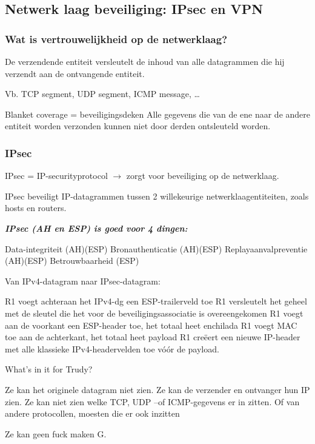 \subsection{Netwerk laag beveiliging: IPsec en VPN}

\subsubsection{Wat is vertrouwelijkheid op de netwerklaag?}

\be
\itf De verzendende entiteit versleutelt de inhoud van alle datagrammen die hij verzendt aan de ontvangende entiteit.

\be
\itf Vb. TCP segment, UDP segment, ICMP message, …
\ee

\itf Blanket coverage = beveiligingsdeken
\be
\itf Alle gegevens die van de ene naar de andere entiteit worden verzonden kunnen niet door derden ontsleuteld worden.
\ee

\ee

\subsubsection{IPsec}

\noindent IPsec = IP-securityprotocol $\rightarrow$ zorgt voor beveiliging op de netwerklaag.

\noindent IPsec beveiligt IP-datagrammen tussen 2 willekeurige netwerklaagentiteiten, zoals hosts en routers.

\noindent \textit{\textbf{IPsec (AH en ESP) is goed voor 4 dingen:}}

\be
\itf Data-integriteit (AH)(ESP)
\itf Bronauthenticatie (AH)(ESP)
\itf Replayaanvalpreventie (AH)(ESP)
\itf Betrouwbaarheid (ESP)
\ee

\noindent Van IPv4-datagram naar IPsec-datagram:

\be
\itf R1 voegt achteraan het IPv4-dg een ESP-trailerveld toe
\itf R1 versleutelt het geheel met de sleutel die het voor de beveiligingsassociatie is overeengekomen
\itf R1 voegt aan de voorkant een ESP-header toe, het totaal heet enchilada
\itf R1 voegt MAC toe aan de achterkant, het totaal heet payload
\itf R1 creëert een nieuwe IP-header met alle klassieke IPv4-headervelden toe vóór de payload.
\ee

\noindent What’s in it for Trudy?

\bi
\itf Ze kan het originele datagram niet zien.
\itf Ze kan de verzender en ontvanger hun IP zien.
\itf Ze kan niet zien welke TCP, UDP –of ICMP-gegevens er in zitten. Of van andere protocollen, moesten die er ook inzitten
\item Ze kan geen fuck maken G.
\ei

